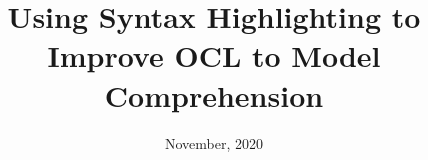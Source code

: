 \frontmatter

\title {
    Using Syntax Highlighting to Improve OCL to Model Comprehension\\
    }
            

\def \supervisortitle {Supervisor}
\def \supervisorname {Fernando Brito e Abreu, PhD, Associate Professor}
\def \supervisoruniv{DCTI/Iscte}

\def \cosupervisortitle {Co-supervisor}
\def \cosupervisorname {Marina Alexandra Pedro Andrade, Assistant Professor}
\def \cosupervisoruniv {DM/Iscte}

\date       {November, 2020}
\subject    {Subject}
\maketitle



\fancyfoot[LE,RO]{\thepage}

\pagestyle{fancy}